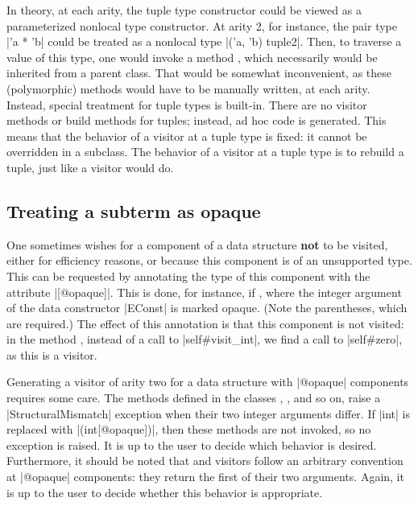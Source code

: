 \documentclass[11pt,a4paper,twoside]{article}
\renewcommand{\emph}[1]{\textbf{#1}}
\begin{document}
In theory, at each arity, the tuple type constructor could be viewed as a
parameterized nonlocal type constructor. At arity 2, for instance, the pair
type \oc|'a * 'b| could be treated as a nonlocal type \oc|('a, 'b) tuple2|.
Then, to traverse a value of this type, one would invoke a method
, which necessarily would be inherited from a parent
class. That would be somewhat inconvenient, as these (polymorphic) methods
would have to be manually written, at each arity. Instead, special treatment
for tuple types is built-in. There are no visitor methods or build methods for
tuples; instead, ad hoc code is generated. This means that the behavior of a
visitor at a tuple type is fixed: it cannot be overridden in a subclass. The
behavior of a \fold visitor at a tuple type is to rebuild a tuple, just like a
\map visitor would do.


\subsection{Treating a subterm as opaque}
\label{sec:opaque}

One sometimes wishes for a component of a data structure \emph{not} to be
visited, either for efficiency reasons, or because this component is of an
unsupported type. This can be requested by annotating the type of this
component with the attribute \oc|[@opaque]|. This is done, for instance, if
, where the integer argument of the data constructor
\oc|EConst| is marked opaque. (Note the parentheses, which are required.) The
effect of this annotation is that this component is not visited: in the method
, instead of a call to \oc|self#visit_int|, we find a
call to \oc|self#zero|, as this is a \reduce visitor.

Generating a visitor of arity two for a data structure with \oc|@opaque|
components requires some care. The methods  defined in the
classes , , and so on, raise a
\oc|StructuralMismatch| exception when their two integer arguments differ. If
\oc|int| is replaced with \oc|(int[@opaque])|, then these methods are not
invoked, so no exception is raised. It is up to the user to decide which
behavior is desired. Furthermore, it should be noted that \maptwo and \foldtwo
visitors follow an arbitrary convention at \oc|@opaque| components: they
return the first of their two arguments. Again, it is up to the user to decide
whether this behavior is appropriate.




\end{document}
